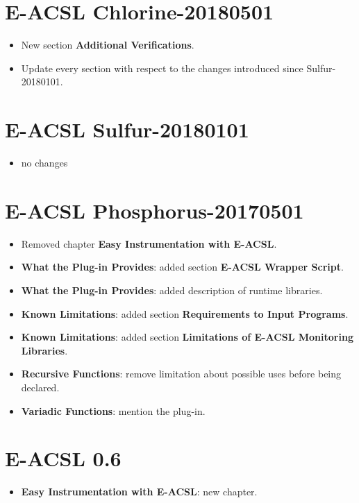 \section*{E-ACSL Chlorine-20180501}

\begin{itemize}
\item New section \textbf{Additional Verifications}.
\item Update every section with respect to the changes introduced since \eacsl
  Sulfur-20180101.
\end{itemize}

\section*{E-ACSL Sulfur-20180101}

\begin{itemize}
\item no changes
\end{itemize}

\section*{E-ACSL Phosphorus-20170501}

\begin{itemize}
\item Removed chapter \textbf{Easy Instrumentation with E-ACSL}.
\item \textbf{What the Plug-in Provides}: added section \textbf{E-ACSL Wrapper
  Script}.
\item \textbf{What the Plug-in Provides}: added description of \eacsl runtime
  libraries.
\item \textbf{Known Limitations}: added section \textbf{Requirements to Input
  Programs}.
\item \textbf{Known Limitations}: added section \textbf{Limitations of E-ACSL Monitoring Libraries}.
\item \textbf{Recursive Functions}: remove limitation about possible uses before
  being declared.
\item \textbf{Variadic Functions}: mention the \variadic plug-in.
\end{itemize}

\section*{E-ACSL 0.6}

\begin{itemize}
\item \textbf{Easy Instrumentation with E-ACSL}: new chapter.
\end{itemize}

